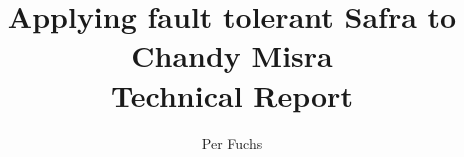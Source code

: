 \documentclass{article}
\title{Applying fault tolerant Safra to Chandy Misra \\
	\large Technical Report}
\author{Per Fuchs}
\begin{document}
	\maketitle
	

	
	
	
	
	
	\nocite{*}
	\printbibliography
\end{document}
